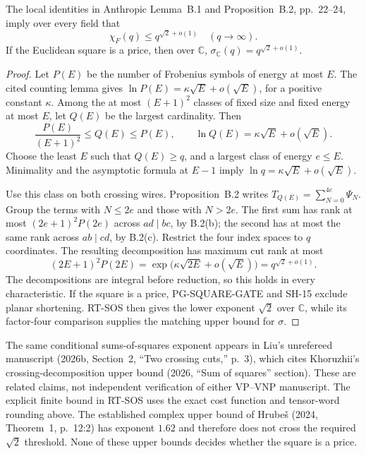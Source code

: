 \begin{proposition}
\label{rt:sos-upper}
The local identities in Anthropic Lemma~B.1 and Proposition~B.2,
pp.~22--24, imply over every field that
\[
 \chi_F(q)\leq q^{\sqrt2+o(1)}\quad(q\longrightarrow\infty).
\]
If the Euclidean square is a price, then over $\mathbb C$,
$\sigma_{\mathbb C}(q)=q^{\sqrt2+o(1)}$.
\end{proposition}
\begin{proof}
Let $P(E)$ be the number of Frobenius symbols of energy at most
$E$. The cited counting lemma gives
$\ln P(E)=\kappa\sqrt E+o(\sqrt E)$, for a positive constant
$\kappa$. Among the at most $(E+1)^2$ classes of fixed size and
fixed energy at most $E$, let $Q(E)$ be the largest cardinality.
Then
\[
 \frac{P(E)}{(E+1)^2}\leq Q(E)\leq P(E),\qquad
 \ln Q(E)=\kappa\sqrt E+o(\sqrt E).
\]
Choose the least $E$ such that $Q(E)\geq q$, and a largest class
of energy $e\leq E$. Minimality and the asymptotic formula at
$E-1$ imply $\ln q=\kappa\sqrt E+o(\sqrt E)$.

Use this class on both crossing wires. Proposition~B.2 writes
$T_{Q(E)}=\sum_{N=0}^{4e}\Psi_N$. Group the terms with
$N\leq2e$ and those with $N>2e$. The first sum has rank at most
$(2e+1)^2P(2e)$ across $ad\mid bc$, by B.2(b); the second has
at most the same rank across $ab\mid cd$, by B.2(c).
Restrict the four index spaces to $q$ coordinates. The resulting
decomposition has maximum cut rank at most
\[
 (2E+1)^2P(2E)
 =\exp\bigl(\kappa\sqrt{2E}+o(\sqrt E)\bigr)
 =q^{\sqrt2+o(1)}.
\]
The decompositions are integral before reduction, so this holds
in every characteristic. If the square is a price, PG-SQUARE-GATE
and SH-15 exclude planar shortening. RT-SOS then gives the lower
exponent $\sqrt2$ over $\mathbb C$, while its factor-four
comparison supplies the matching upper bound for $\sigma$.
\end{proof}

The same conditional sums-of-squares exponent appears in Liu's
unrefereed manuscript (2026b, Section~2, ``Two crossing cuts,'' p.~3),
which cites Khoruzhii's crossing-decomposition upper bound (2026,
``Sum of squares'' section). These are related claims, not independent
verification of either VP--VNP manuscript. The explicit finite bound
in RT-SOS uses the exact cost function and tensor-word rounding above.
The established complex upper bound of Hrube\v{s} (2024,
Theorem~1, p.~12:2) has exponent $1.62$ and therefore does not
cross the required $\sqrt2$ threshold. None of these upper bounds
decides whether the square is a price.

